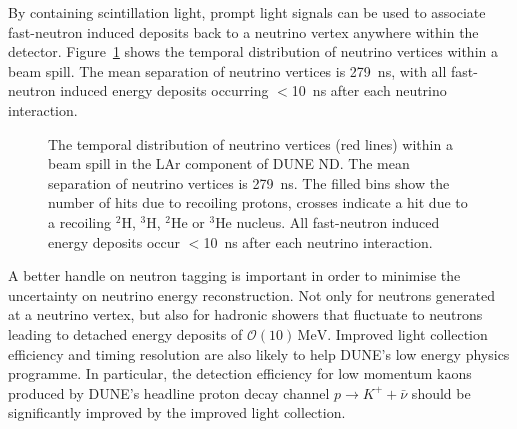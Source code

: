 \documentclass[a4paper]{article}
\begin{document}
By containing scintillation light, prompt light signals can be used to associate fast-neutron induced deposits back to a neutrino vertex anywhere within the detector.
Figure~\ref{fig:Timing} shows the temporal distribution of neutrino vertices within a beam spill.
The mean separation of neutrino vertices is \SI{279}{\nano\second}, with all fast-neutron induced energy deposits occurring $<$\SI{10}{\nano\second} after each neutrino interaction.      

\begin{figure}[htb]
	\caption{The temporal distribution of neutrino vertices (red lines) within a beam spill in the LAr component of DUNE ND.
		The mean separation of neutrino vertices is \SI{279}{\nano\second}. The filled bins show the number of hits due to recoiling protons, crosses indicate a hit due to a recoiling $^{2}$H, $^3$H, $^2$He or $^3$He nucleus.
		All fast-neutron induced energy deposits occur $<$\SI{10}{\nano\second} after each neutrino interaction.}
	\label{fig:Timing}
\end{figure}

A better handle on neutron tagging is important in order to minimise the uncertainty on neutrino energy reconstruction.
Not only for neutrons generated at a neutrino vertex, but also for hadronic showers that fluctuate to neutrons leading to detached energy deposits of $\mathcal{O}\left(10\right)\,\mathrm{MeV}$.   
Improved light collection efficiency and timing resolution are also likely to help DUNE's low energy physics programme. In particular, the detection efficiency for low momentum kaons produced by DUNE's headline proton decay channel $p\rightarrow K^{+} + \bar{\nu}$ should be significantly improved by the improved light collection.

	
	\printbibliography
	
\end{document}
